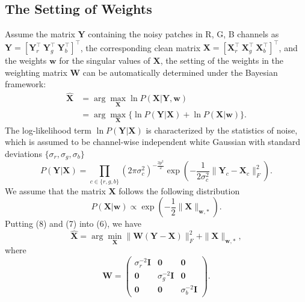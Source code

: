 \documentclass[10pt,twocolumn,letterpaper,sort&compress]{article}
\begin{document}
\subsection{The Setting of Weights}
Assume the matrix $\mathbf{Y}$ containing the noisy patches in R, G, B channels as $\mathbf{Y}=[\mathbf{Y}_{r}^{\top}\ \mathbf{Y}_{g}^{\top}\ \mathbf{Y}_{b}^{\top}]^{\top}$, the corresponding clean matrix $\mathbf{X}=[\mathbf{X}_{r}^{\top}\ \mathbf{X}_{g}^{\top}\ \mathbf{X}_{b}^{\top}]^{\top}$, and the weights $\bm{w}$ for the singular values of $\mathbf{X}$, the setting of the weights in the weighting matrix $\mathbf{W}$ can be automatically determined under the Bayesian framework:
\begin{equation}
\begin{split}
\hat{\mathbf{X}} 
&=
\arg\max_{\mathbf{X}}\ln P(\mathbf{X}|\mathbf{Y},\bm{w})
\\
&
=
\arg\max_{\mathbf{X}}\{\ln P(\mathbf{Y}|\mathbf{X})+\ln P(\mathbf{X}|\bm{w})\}.
\end{split}
\end{equation}
The log-likelihood term $\ln P(\mathbf{Y}|\mathbf{X})$ is characterized by the
statistics of noise, which is assumed to be channel-wise independent white Gaussian with standard deviations $\{\sigma_{r}, \sigma_{g}, \sigma_{b}\}$
\begin{equation}
P(\mathbf{Y}|\mathbf{X}) 
= 
\prod_{c\in\{r, g, b\}}
(2\pi\sigma_{c}^{2})^{-\frac{3p^{2}}{2}}
\exp(-\frac{1}{2\sigma_{c}^{2}}\|\mathbf{Y}_{c}-\mathbf{X}_{c}\|_{F}^{2}).
\end{equation}
We assume that the matrix $\mathbf{X}$ follows the following distribution
\begin{equation}
P(\mathbf{X}|\bm{w})
\propto
\exp(-\frac{1}{2}\|\mathbf{X}\|_{\bm{w},*}).
\end{equation}
Putting (8) and (7) into (6), we have
\begin{equation}
\hat{\mathbf{X}}=\arg\min_{\mathbf{X}}\|\mathbf{W}(\mathbf{Y}-\mathbf{X})\|_{F}^{2}+\|\mathbf{X}\|_{\bm{w},*},
\end{equation}
where
\begin{equation}
\mathbf{W}
=
\left( \begin{array}{ccc}
\sigma_{r}^{-2}\mathbf{I} & \mathbf{0} & \mathbf{0}
\\
\mathbf{0} & \sigma_{g}^{-2}\mathbf{I} & \mathbf{0}
\\
\mathbf{0} & \mathbf{0} & \sigma_{b}^{-2}\mathbf{I}
\end{array} \right).
\end{equation}
\end{document}
